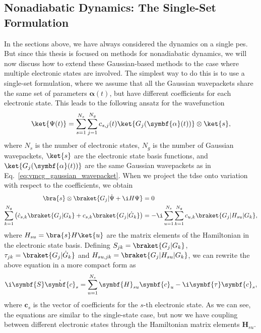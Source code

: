 \subsection{Nonadiabatic Dynamics: The Single-Set Formulation}
In the sections above, we have always considered the dynamics on a single \acrshort{pes}. But since this thesis is focused on methods for nonadiabatic dynamics, we will now discuss how to extend these Gaussian-based methods to the case where multiple electronic states are involved. The simplest way to do this is to use a single-set formulation, where we assume that all the Gaussian wavepackets share the same set of parameters $\symbf{\alpha}(t)$, but have different coefficients for each electronic state. This leads to the following ansatz for the wavefunction
\begin{equation}
\ket{\Psi(t)}=\sum_{s=1}^{N_s}\sum_{j=1}^{N_g} c_{s,j}(t)\ket{G_j(\symbf{\alpha}(t))}\otimes\ket{s},
\end{equation}
where $N_s$ is the number of electronic states, $N_g$ is the number of Gaussian wavepackets, $\ket{s}$ are the electronic state basis functions, and $\ket{G_j(\symbf{\alpha}(t))}$ are the same Gaussian wavepackets as in Eq.~\eqref{eq:vmcg_gaussian_wavepacket}. When we project the \acrshort{tdse} onto variation with respect to the coefficients, we obtain
\begin{align}
\bra{s}\otimes\braket{G_j|\dot\Psi+\i H\Psi}&=0\\
\sum_{k=1}^{N_g}\left(\dot c_{s,k}\braket{G_j|G_k}+c_{s,k}\braket{G_j|\dot G_k}\right)&=-\i\sum_{\vphantom{k}u=1}^{\vphantom{N_g}N_s}\sum_{k=1}^{N_g}c_{u,k}\braket{G_j|H_{su}|G_k},
\end{align}
where $H_{su}=\bra{s}H\ket{u}$ are the matrix elements of the Hamiltonian in the electronic state basis. Defining $S_{jk}=\braket{G_j|G_k}$, $\tau_{jk}=\braket{G_j|\dot G_k}$ and $H_{su,jk}=\braket{G_j|H_{su}|G_k}$, we can rewrite the above equation in a more compact form as
\begin{equation}
\i\symbf{S}\dot{\symbf{c}}_s=\sum_{u=1}^{N_s}\symbf{H}_{su}\symbf{c}_u-\i\symbf{\tau}\symbf{c}_s,
\end{equation}
where $\symbf{c}_s$ is the vector of coefficients for the $s$-th electronic state. As we can see, the equations are similar to the single-state case, but now we have coupling between different electronic states through the Hamiltonian matrix elements $\symbf{H}_{su}$.

